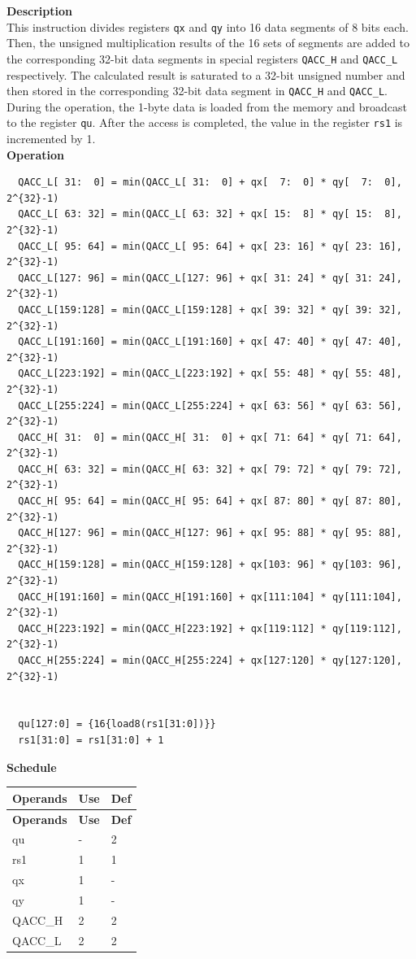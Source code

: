 \textbf{Description}\\
This instruction divides registers \lstinline{qx} and \lstinline{qy} into 16 data segments of 8 bits each. Then, the unsigned multiplication results of the 16 sets of segments are added to the corresponding 32-bit data segments in special registers \lstinline{QACC_H} and \lstinline{QACC_L} respectively. The calculated result is saturated to a 32-bit unsigned number and then stored in the corresponding 32-bit data segment in \lstinline{QACC_H} and \lstinline{QACC_L}.\\
During the operation, the 1-byte data is loaded from the memory and broadcast to the register \lstinline{qu}. After the access is completed, the value in the register \lstinline{rs1} is incremented by 1.\\
\textbf{Operation}
\begin{lstlisting}
  QACC_L[ 31:  0] = min(QACC_L[ 31:  0] + qx[  7:  0] * qy[  7:  0], 2^{32}-1)
  QACC_L[ 63: 32] = min(QACC_L[ 63: 32] + qx[ 15:  8] * qy[ 15:  8], 2^{32}-1)
  QACC_L[ 95: 64] = min(QACC_L[ 95: 64] + qx[ 23: 16] * qy[ 23: 16], 2^{32}-1)
  QACC_L[127: 96] = min(QACC_L[127: 96] + qx[ 31: 24] * qy[ 31: 24], 2^{32}-1)
  QACC_L[159:128] = min(QACC_L[159:128] + qx[ 39: 32] * qy[ 39: 32], 2^{32}-1)
  QACC_L[191:160] = min(QACC_L[191:160] + qx[ 47: 40] * qy[ 47: 40], 2^{32}-1)
  QACC_L[223:192] = min(QACC_L[223:192] + qx[ 55: 48] * qy[ 55: 48], 2^{32}-1)
  QACC_L[255:224] = min(QACC_L[255:224] + qx[ 63: 56] * qy[ 63: 56], 2^{32}-1)
  QACC_H[ 31:  0] = min(QACC_H[ 31:  0] + qx[ 71: 64] * qy[ 71: 64], 2^{32}-1)
  QACC_H[ 63: 32] = min(QACC_H[ 63: 32] + qx[ 79: 72] * qy[ 79: 72], 2^{32}-1)
  QACC_H[ 95: 64] = min(QACC_H[ 95: 64] + qx[ 87: 80] * qy[ 87: 80], 2^{32}-1)
  QACC_H[127: 96] = min(QACC_H[127: 96] + qx[ 95: 88] * qy[ 95: 88], 2^{32}-1)
  QACC_H[159:128] = min(QACC_H[159:128] + qx[103: 96] * qy[103: 96], 2^{32}-1)
  QACC_H[191:160] = min(QACC_H[191:160] + qx[111:104] * qy[111:104], 2^{32}-1)
  QACC_H[223:192] = min(QACC_H[223:192] + qx[119:112] * qy[119:112], 2^{32}-1)
  QACC_H[255:224] = min(QACC_H[255:224] + qx[127:120] * qy[127:120], 2^{32}-1)


  qu[127:0] = {16{load8(rs1[31:0])}}
  rs1[31:0] = rs1[31:0] + 1
\end{lstlisting}

\textbf{Schedule}\\
\begin{longtable}[c]{|l|l|l|}
    \hline
    \rowcolor{lightgray}
    \textbf{Operands} & \textbf{Use} & \textbf{Def} \\\hline
    \endfirsthead
    \hline
    \rowcolor{lightgray}
     \textbf{Operands} & \textbf{Use} & \textbf{Def} \\\hline
    \endhead
    \hline
    \endfoot

    qu & - & 2 \\\hline
    rs1 & 1 & 1 \\\hline
     qx & 1 & - \\\hline
     qy & 1 & - \\\hline
     QACC\_H & 2 & 2 \\\hline
     QACC\_L & 2 & 2

\end{longtable}

